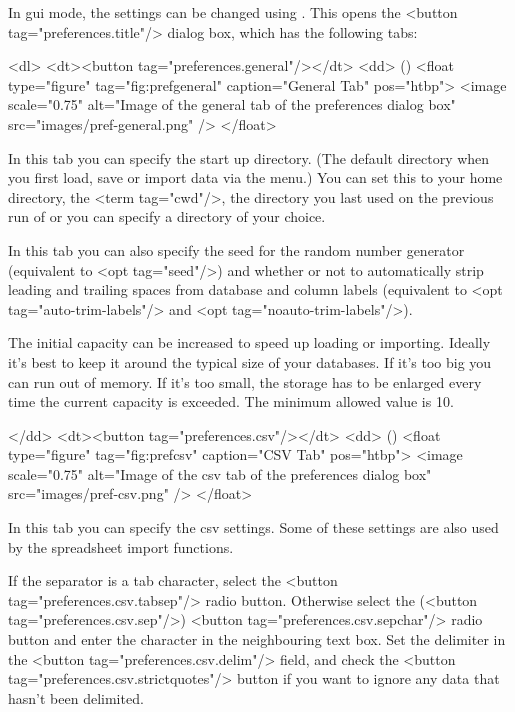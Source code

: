    In \gls{gui} mode, the settings can be changed using
   . This opens the 
   <button tag="preferences.title"/> dialog box, which has the 
   following tabs:

   <dl>
    <dt><button tag="preferences.general"/></dt>
    <dd>
     ()
     <float type="figure" tag="fig:prefgeneral" caption="General Tab" pos="htbp">
      <image scale="0.75" alt="Image of the general tab of the preferences dialog box" src="images/pref-general.png" />
     </float>

     In this tab you can specify the start up directory. (The default 
     directory when you first load, save or import data via the 
      menu.) You can set this to your home directory,
     the <term tag="cwd"/>, the directory you last used on the previous run
     of  or you can specify a directory of your choice.


     In this tab you can also specify the seed for the random number generator 
     (equivalent to <opt tag="seed"/>) and whether or not to automatically
     strip leading and trailing spaces from database and column labels
     (equivalent to <opt tag="auto-trim-labels"/> and 
     <opt tag="noauto-trim-labels"/>).


     The initial capacity can be increased to speed up loading or importing.
     Ideally it's best to keep it around the typical size of your databases.
     If it's too big you can run out of memory. If it's too small, the storage
     has to be enlarged every time the current capacity is exceeded. The
     minimum allowed value is 10.

    </dd>
    <dt><button tag="preferences.csv"/></dt>
    <dd>
     ()
     <float type="figure" tag="fig:prefcsv" caption="CSV Tab" pos="htbp">
      <image scale="0.75" alt="Image of the csv tab of the preferences dialog box" src="images/pref-csv.png" />
     </float>

     In this tab you can specify the \gls{csv} settings. Some of
     these settings are also used by the spreadsheet import functions.

If the separator is a tab character, select the 
     <button tag="preferences.csv.tabsep"/> radio button. Otherwise
     select the (<button tag="preferences.csv.sep"/>) <button tag="preferences.csv.sepchar"/> radio button
     and enter the character in the neighbouring text box. Set the delimiter
     in the <button tag="preferences.csv.delim"/> field, and
     check the <button tag="preferences.csv.strictquotes"/> button
     if you want to ignore any data that hasn't been delimited.


